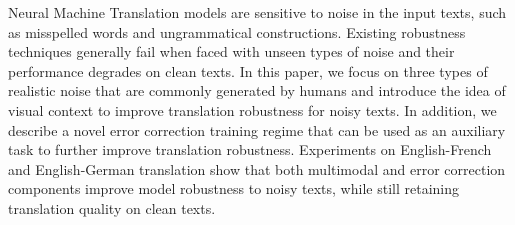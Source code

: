 Neural Machine Translation models are sensitive to noise in the input texts, such as misspelled words and ungrammatical constructions. Existing robustness techniques generally fail when faced with unseen types of noise and their performance degrades on clean texts. In this paper, we focus on three types of realistic noise that are commonly generated by humans and introduce the idea of visual context to improve translation robustness for noisy texts. In addition, we describe a novel error correction training regime that can be used as an auxiliary task to further improve translation robustness. Experiments on English-French and English-German translation show that both multimodal and error correction components improve model robustness to noisy texts, while still retaining translation quality on clean texts.
